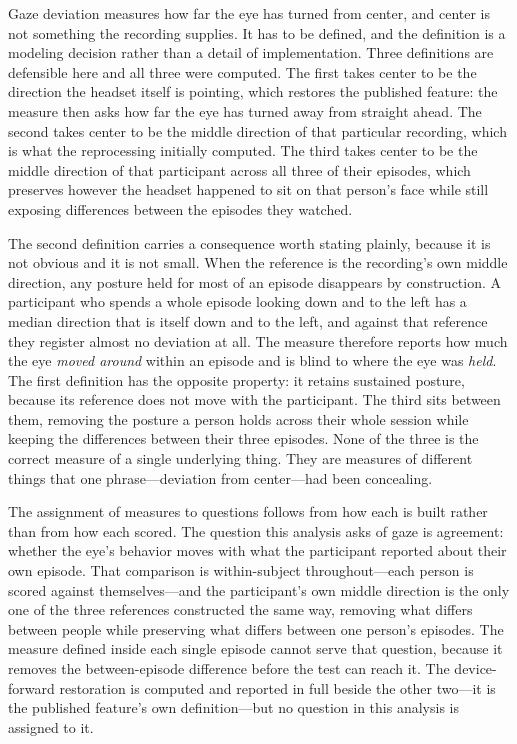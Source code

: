 Gaze deviation measures how far the eye has turned from center, and center is not something
the recording supplies. It has to be defined, and the definition is a modeling decision
rather than a detail of implementation. Three definitions are defensible here and all three
were computed. The first takes center to be the direction the headset itself is pointing,
which restores the published feature: the measure then asks how far the eye has turned away
from straight ahead. The second takes center to be the middle direction of that particular
recording, which is what the reprocessing initially computed. The third takes center to be
the middle direction of that participant across all three of their episodes, which preserves
however the headset happened to sit on that person's face while still exposing differences
between the episodes they watched.

The second definition carries a consequence worth stating plainly, because it is not obvious
and it is not small. When the reference is the recording's own middle direction, any posture
held for most of an episode disappears by construction. A participant who spends a whole
episode looking down and to the left has a median direction that is itself down and to the
left, and against that reference they register almost no deviation at all. The measure
therefore reports how much the eye \textit{moved around} within an episode and is blind to
where the eye was \textit{held}. The first definition has the opposite property: it retains
sustained posture, because its reference does not move with the participant. The third sits
between them, removing the posture a person holds across their whole session while keeping
the differences between their three episodes. None of the three is the correct measure of a
single underlying thing. They are measures of different things that one phrase---deviation
from center---had been concealing.

The assignment of measures to questions follows from how each is built rather than from how
each scored. The question this analysis asks of gaze is agreement: whether the eye's behavior
moves with what the participant reported about their own episode. That comparison is
within-subject throughout---each person is scored against themselves---and the participant's
own middle direction is the only one of the three references constructed the same way,
removing what differs between people while preserving what differs between one person's
episodes. The measure defined inside each single episode cannot serve that question, because
it removes the between-episode difference before the test can reach it. The device-forward
restoration is computed and reported in full beside the other two---it is the published
feature's own definition---but no question in this analysis is assigned to it.

